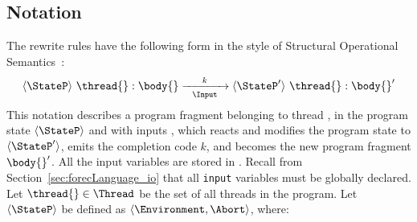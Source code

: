 \subsection{Notation}
The rewrite rules have the following form in the style of 
Structural Operational Semantics~\cite{semantics_sos}:
\begin{equation*}
	\langle \StateP \rangle ~ \thread{}:\body{} 
		\xrightarrow[~~\Input~~]{k} 
	\langle \StateP' \rangle ~ \thread{}:\body{}'
\end{equation*}
This notation describes a program fragment \body{} belonging to thread \thread{},
in the program state $\langle \StateP \rangle$ and with inputs \Input{}, which
reacts and modifies the program state to $\langle \StateP' \rangle$, emits the 
completion code $k$, and becomes the new program fragment $\body{}'$. 
All the input variables are stored in \Input{}. Recall 
from Section~\ref{sec:forecLanguage_io} that all \verb$input$ variables 
must be globally declared.
Let $\thread{} \in \Thread$ be the set of all threads in the program. 
Let $\langle \StateP \rangle$ be defined as 
$\langle \Environment, \Abort \rangle$, where:
